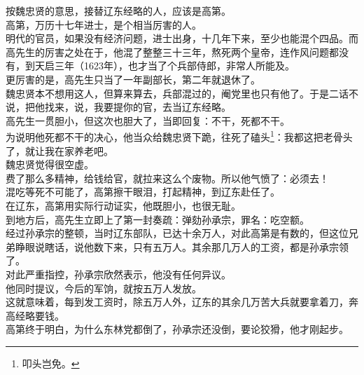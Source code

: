 \begin{multicols}{\theparacolNo}
按魏忠贤的意思，接替辽东经略的人，应该是高第。\\

高第，万历十七年进士，是个相当厉害的人。\\

明代的官员，如果没有经济问题，进士出身，十几年下来，至少也能混个四品。而高先生的厉害之处在于，他混了整整三十三年，熬死两个皇帝，连作风问题都没有，到天启三年（1623年），也才当了个兵部侍郎，非常人所能及。\\

更厉害的是，高先生只当了一年副部长，第二年就退休了。\\

魏忠贤本不想用这人，但算来算去，兵部混过的，阉党里也只有他了。于是二话不说，把他找来，说，我要提你的官，去当辽东经略。\\

高先生一贯胆小，但这次也胆大了，当即回复：不干，死都不干。\\

为说明他死都不干的决心，他当众给魏忠贤下跪，往死了磕头\footnote{叩头岂免。}：我都这把老骨头了，就让我在家养老吧。\\

魏忠贤觉得很空虚。\\

费了那么多精神，给钱给官，就拉来这么个废物。所以他气愤了：必须去！\\

混吃等死不可能了，高第擦干眼泪，打起精神，到辽东赴任了。\\

在辽东，高第用实际行动证实，他既胆小，也很无耻。\\

到地方后，高先生立即上了第一封奏疏：弹劾孙承宗，罪名：吃空额。\\

经过孙承宗的整顿，当时辽东部队，已达十余万人，对此高第是有数的，但这位兄弟睁眼说瞎话，说他数下来，只有五万人。其余那几万人的工资，都是孙承宗领了。\\

对此严重指控，孙承宗欣然表示，他没有任何异议。\\

他同时提议，今后的军饷，就按五万人发放。\\

这就意味着，每到发工资时，除五万人外，辽东的其余几万苦大兵就要拿着刀，奔高经略要钱。\\

高第终于明白，为什么东林党都倒了，孙承宗还没倒，要论狡猾，他才刚起步。\\


\end{multicols}
